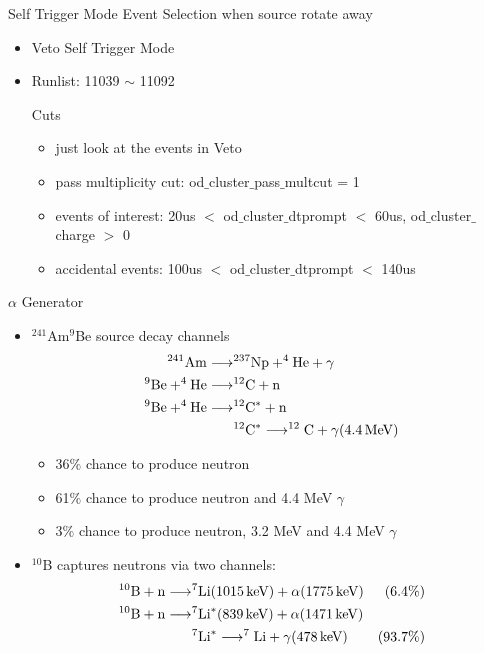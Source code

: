 \documentclass[9pt]{beamer}
\begin{document}
\begin{frame}{Self Trigger Mode Event Selection when source rotate away}
\begin{itemize}
[bullet]
\item Veto Self Trigger Mode
\item Runlist: 11039 $\sim$ 11092
\begin{exampleblock}{Cuts}
	\begin{itemize}
	[default]
        \item just look at the events in Veto
	\item pass multiplicity cut: od$\_$cluster$\_$pass$\_$multcut = 1  
        \item events of interest: 20us $<$ od$\_$cluster$\_$dtprompt $<$ 60us, od$\_$cluster$\_$charge $>$ 0
        \item accidental events: 100us $<$ od$\_$cluster$\_$dtprompt $<$ 140us
	\end{itemize}
\end{exampleblock}	
\end{itemize}
\end{frame}

\begin{frame}{$\alpha$ Generator}
\begin{itemize}
[bullet]
\item $^{241}$Am$^9$Be source decay channels
\begin{align}
^{241}\rm{Am} \longrightarrow &  ^{237}\rm{Np}+ ^{4}\rm{He} + \gamma  \\
^{9}\rm{Be} + ^{4}\rm{He}  \longrightarrow & ^{12}\rm{C} + n    \\
^{9}\rm{Be} + ^{4}\rm{He}  \longrightarrow  & ^{12}\rm{C}^* + n   \\
	& ^{12}\rm{C}^* \longrightarrow ^{12}\rm{C} + \gamma(4.4\,MeV)
\end{align}
	\begin{itemize}
	[default]
	\item 36$\%$ chance to produce neutron   
	\item 61$\%$ chance to produce neutron and 4.4 MeV $\gamma$
	\item 3$\%$ chance to produce neutron, 3.2 MeV and 4.4 MeV $\gamma$
	\end{itemize}
\item $^{10}$B captures neutrons via two channels:
\begin{align}
^{10}\rm{B} + n \longrightarrow  & ^{7}\rm{Li}(1015\, keV) + \alpha(1775\,keV)  & (6.4\%) \\
^{10}\rm{B} + n \longrightarrow  & ^{7}\rm{Li}^{*}(839\, keV) + \alpha(1471\, keV) &  \\
         & ^{7}\rm{Li}^{*}  \longrightarrow ^{7}\rm{Li} + \gamma(478\, keV)  & (93.7\%)
\end{align}
\end{itemize}
\end{frame}
\end{document}
